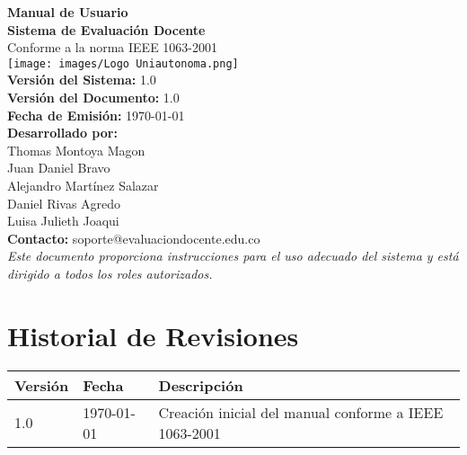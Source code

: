 \documentclass[12pt,a4paper]{article}
\begin{document}
\begin{titlepage}
\begin{center}
\vspace*{2cm}
{\Huge \textbf{Manual de Usuario}}\\[0.5cm]
{\LARGE \textbf{Sistema de Evaluación Docente}}\\[0.5cm]
{\large Conforme a la norma IEEE 1063-2001}\\[2cm]
\texttt{[image: images/Logo Uniautonoma.png]}\\[1cm]
\textbf{Versión del Sistema:} 1.0\\
\textbf{Versión del Documento:} 1.0\\
\textbf{Fecha de Emisión:} \today\\[2.5cm]
\textbf{Desarrollado por:}\\[0.3cm]
Thomas Montoya Magon\\
Juan Daniel Bravo\\
Alejandro Martínez Salazar\\
Daniel Rivas Agredo\\
Luisa Julieth Joaqui\\[2cm]
\textbf{Contacto:} soporte@evaluaciondocente.edu.co\\
\vfill
\textit{Este documento proporciona instrucciones para el uso adecuado del sistema y está dirigido a todos los roles autorizados.}\\
\end{center}
\end{titlepage}

\clearpage
\section*{Historial de Revisiones}
\begin{center}
\begin{tabular}{lll}
\toprule
\textbf{Versión} & \textbf{Fecha} & \textbf{Descripción} \\
\midrule
1.0 & \today & Creación inicial del manual conforme a IEEE 1063-2001 \\
\bottomrule
\end{tabular}
\end{center}

\clearpage
\tableofcontents
\clearpage
\listoffigures
{}
\clearpage
\listoftables
{}
\clearpage
\end{document}
